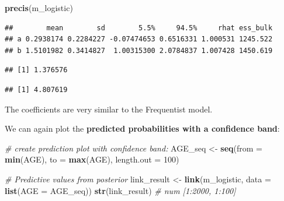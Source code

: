 \documentclass[
]{book}
\newenvironment{Shaded}{\begin{snugshade}}{\end{snugshade}}
\newcommand{\AttributeTok}[1]{\textcolor[rgb]{0.13,0.29,0.53}{#1}}
\newcommand{\CommentTok}[1]{\textcolor[rgb]{0.56,0.35,0.01}{\textit{#1}}}
\newcommand{\DecValTok}[1]{\textcolor[rgb]{0.00,0.00,0.81}{#1}}
\newcommand{\FunctionTok}[1]{\textcolor[rgb]{0.13,0.29,0.53}{\textbf{#1}}}
\newcommand{\NormalTok}[1]{#1}
\newcommand{\OtherTok}[1]{\textcolor[rgb]{0.56,0.35,0.01}{#1}}
\newcommand{\SpecialCharTok}[1]{\textcolor[rgb]{0.81,0.36,0.00}{\textbf{#1}}}
\begin{document}
\begin{Shaded}
\begin{Highlighting}[]
\FunctionTok{precis}\NormalTok{(m\_logistic)}
\end{Highlighting}
\end{Shaded}

\begin{verbatim}
##        mean        sd        5.5%     94.5%     rhat ess_bulk
## a 0.2938174 0.2284227 -0.07474653 0.6516331 1.000531 1245.522
## b 1.5101982 0.3414827  1.00315300 2.0784837 1.007428 1450.619
\end{verbatim}

\begin{Shaded}
\end{Shaded}

\begin{verbatim}
## [1] 1.376576
\end{verbatim}

\begin{Shaded}
\end{Shaded}

\begin{verbatim}
## [1] 4.807619
\end{verbatim}

The coefficients are very similar to the Frequentist model.

We can again plot the \textbf{predicted probabilities with a confidence band}:

\begin{Shaded}
\begin{Highlighting}[]
\CommentTok{\# create prediction plot with confidence band:}
\NormalTok{AGE\_seq }\OtherTok{\textless{}{-}} \FunctionTok{seq}\NormalTok{(}\AttributeTok{from =} \FunctionTok{min}\NormalTok{(AGE), }\AttributeTok{to =} \FunctionTok{max}\NormalTok{(AGE), }\AttributeTok{length.out =} \DecValTok{100}\NormalTok{)}

\CommentTok{\# Predictive values from posterior}
\NormalTok{link\_result }\OtherTok{\textless{}{-}} \FunctionTok{link}\NormalTok{(m\_logistic, }\AttributeTok{data =} \FunctionTok{list}\NormalTok{(}\AttributeTok{AGE =}\NormalTok{ AGE\_seq))}
\FunctionTok{str}\NormalTok{(link\_result) }\CommentTok{\# num [1:2000, 1:100]}
\end{Highlighting}
\end{Shaded}
\end{document}

